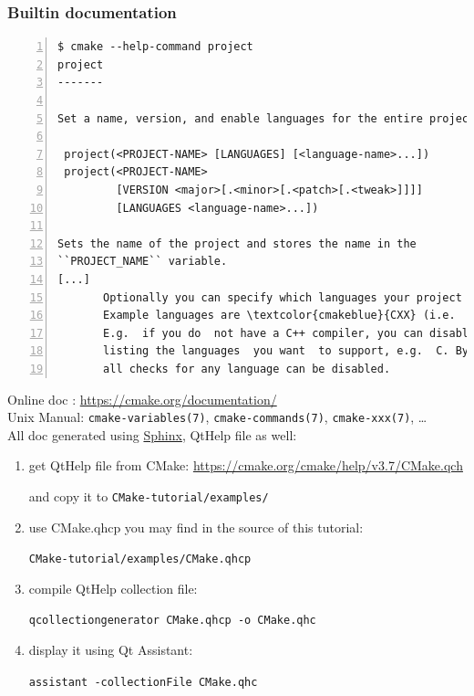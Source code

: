 \documentclass[compress,slidestop,table,usepdftitle=false
              ]
               {beamer}
\begin{document}
\begin{frame}
\frametitle{Builtin documentation}
\begin{Verbatim}[commandchars=\\\{\},fontsize=\tiny,numbers=left,frame=topline,label=CMake builtin doc for 'project' command]
  $ cmake --help-command project
project
-------

Set a name, version, and enable languages for the entire project.

 project(<PROJECT-NAME> [LANGUAGES] [<language-name>...])
 project(<PROJECT-NAME>
         [VERSION <major>[.<minor>[.<patch>[.<tweak>]]]]
         [LANGUAGES <language-name>...])

Sets the name of the project and stores the name in the
``PROJECT_NAME`` variable.
[...]
       Optionally you can specify which languages your project supports.
       Example languages are \textcolor{cmakeblue}{CXX} (i.e.  C++), \textcolor{cmakeblue}{C}, \textcolor{cmakeblue}{Fortran}, etc.  By \textcolor{cmakered}{default C} \textcolor{cmakered}{and CXX are enabled}.
       E.g.  if you do  not have a C++ compiler, you can disable the check  for it by  explicitly
       listing the languages  you want  to support, e.g.  C. By using the special language "\textcolor{cmakeblue}{NONE}"
       all checks for any language can be disabled.
\end{Verbatim}
Online doc : \url{https://cmake.org/documentation/}\\
Unix Manual: {\scriptsize \texttt{cmake-variables(7)}, \texttt{cmake-commands(7)}, \texttt{cmake-xxx(7)}, \ldots}\\
All doc generated using \href{http://www.sphinx-doc.org/en/stable/builders.html}{Sphinx},
QtHelp file as well:\\
\begin{small}
\begin{enumerate}
\item get QtHelp file from CMake: \url{https://cmake.org/cmake/help/v3.7/CMake.qch}

      and copy it to \texttt{CMake-tutorial/examples/}
\item use CMake.qhcp you may find in the source of this tutorial:

      \texttt{CMake-tutorial/examples/CMake.qhcp}
\item compile QtHelp collection file:

      \texttt{qcollectiongenerator CMake.qhcp -o CMake.qhc}
\item display it using Qt Assistant:

  \texttt{assistant -collectionFile CMake.qhc}
\end{enumerate}
\end{small}
\end{frame}
\end{document}
